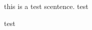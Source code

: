 \begin{Introduction} %
	\begin{Introduction} %
		\begin{Introduction} %
			this is a test scentence. 
			test
		\end{Introduction}
		\begin{Introduction}
			test
		\end{Introduction}
	\end{Introduction}
\end{Introduction}
